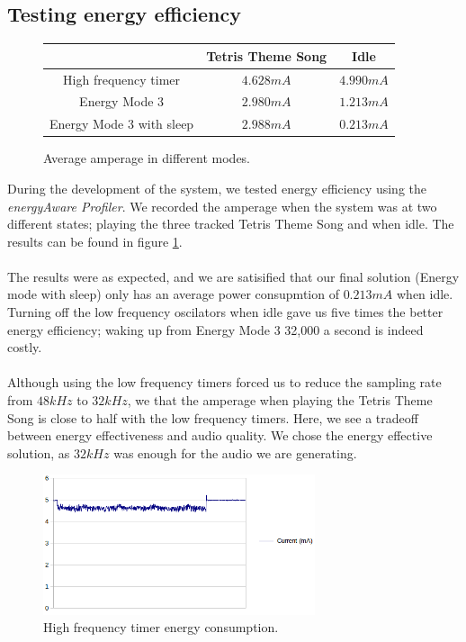 \subsection{Testing energy efficiency}
\begin{figure}[t]
	\centering
	\begin{tabular}{c | c  c}
			& Tetris Theme Song & Idle \\
		\hline
		\hline
		High frequency timer & $4.628mA$ & $4.990mA$ \\
		Energy Mode 3 & $2.980mA$ & $1.213mA$ \\
		Energy Mode 3 with sleep & $2.988mA$ & $0.213mA$ \\

	\end{tabular}
	\label{fig:energy_results}
	\caption{Average amperage in different modes.}

\end{figure}
During the development of the system, we tested energy efficiency using the \emph{energyAware Profiler}. We recorded the amperage when the system was at two different states; playing the three tracked Tetris Theme Song and when idle. The results can be found in figure \ref{fig:energy_results}. \\
\\
The results were as expected, and we are satisified that our final solution (Energy mode with sleep) only has an average power consupmtion of $0.213mA$ when idle. Turning off the low frequency oscilators when idle gave us five times the better energy efficiency; waking up from Energy Mode 3 32,000 a second is indeed costly.\\
\\
Although using the low frequency timers forced us to reduce the sampling rate from $48kHz$ to $32kHz$, we that the amperage when playing the Tetris Theme Song is close to half with the low frequency timers. Here, we see a tradeoff between energy effectiveness and audio quality. We chose the energy effective solution, as $32kHz$ was enough for the audio we are generating.

\begin{figure}[t]
	\centering
	\includegraphics[width=8cm]{img/hf.png}
	\caption{High frequency timer energy consumption.}
	\label{fig:hf}
\end{figure}
	
